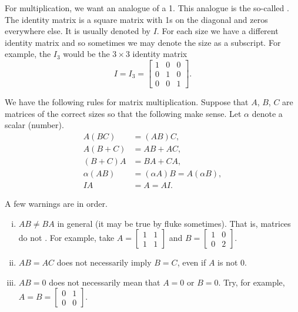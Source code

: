 \medskip

For multiplication, we want an analogue of a 1.  This analogue is the
so-called \emph{}.
The identity matrix is a square matrix with 1s on the
diagonal and zeros everywhere else.  It is usually denoted by $I$.
For each size we have a different identity matrix and so sometimes we may denote
the size as a subscript.  For example, the $I_3$ would be the $3 \times 3$
identity matrix
\begin{equation*}
I = I_3 =
\begin{bmatrix}
1 & 0 & 0 \\
0 & 1 & 0 \\
0 & 0 & 1
\end{bmatrix} .
\end{equation*}

We have the following rules for matrix multiplication.  Suppose that
$A$, $B$, $C$ are matrices of the correct sizes so that the following
make sense.  Let $\alpha$ denote a scalar (number).
\begin{align*}
A(BC) & = (AB)C, \\
A(B+C) & = AB + AC, \\
(B+C)A & = BA + CA, \\
\alpha(AB) & = (\alpha A)B = A(\alpha B), \\
IA & = A = AI .
\end{align*}

\pagebreak[2]
A few warnings are in order.
\begin{enumerate}[(i)]
\item $AB \not= BA$ in general (it may be true by fluke sometimes).  That is,
matrices do not .
For example, take
$A = \left[ \begin{smallmatrix} 1 & 1 \\ 1 & 1 \end{smallmatrix} \right]$
and
$B = \left[ \begin{smallmatrix} 1 & 0 \\ 0 & 2 \end{smallmatrix} \right]$.
\item $AB = AC$ does not necessarily imply $B=C$, even if $A$ is not 0.
\item $AB = 0$ does not necessarily mean that $A=0$ or $B=0$.
Try, for example,
$A = B = \left[ \begin{smallmatrix} 0 & 1 \\ 0 & 0 \end{smallmatrix}
\right]$.
\end{enumerate}

